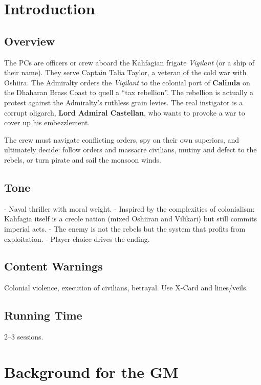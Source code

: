 \documentclass[11pt]{article}
\begin{document}



\tableofcontents


\section{Introduction}

\subsection{Overview}
The PCs are officers or crew aboard the Kahfagian frigate \textit{Vigilant} (or a ship of their name). They serve Captain Talia Taylor, a veteran of the cold war with Oshiira. The Admiralty orders the \textit{Vigilant} to the colonial port of \textbf{Calinda} on the Dhaharan Brass Coast to quell a ``tax rebellion''. The rebellion is actually a protest against the Admiralty's ruthless grain levies. The real instigator is a corrupt oligarch, \textbf{Lord Admiral Castellan}, who wants to provoke a war to cover up his embezzlement.

The crew must navigate conflicting orders, spy on their own superiors, and ultimately decide: follow orders and massacre civilians, mutiny and defect to the rebels, or turn pirate and sail the monsoon winds.

\subsection{Tone}
- Naval thriller with moral weight.
- Inspired by the complexities of colonialism: Kahfagia itself is a creole nation (mixed Oshiiran and Vilikari) but still commits imperial acts.
- The enemy is not the rebels but the system that profits from exploitation.
- Player choice drives the ending.

\subsection{Content Warnings}
Colonial violence, execution of civilians, betrayal. Use X-Card and lines/veils.

\subsection{Running Time}
2--3 sessions.

\section{Background for the GM}
\end{document}
